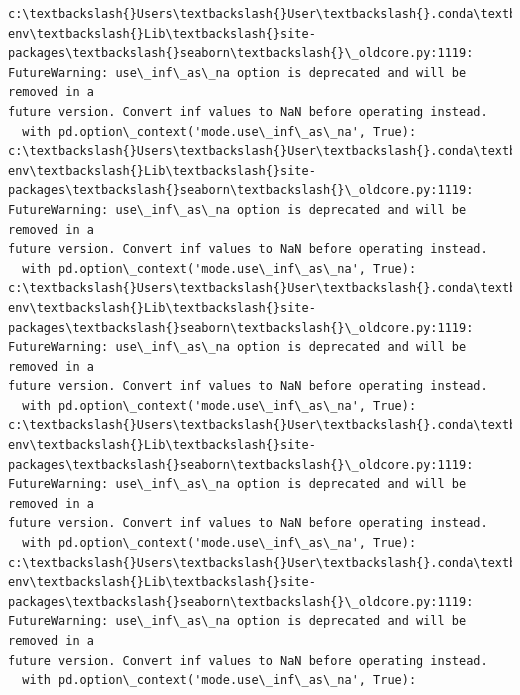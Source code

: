 \documentclass[11pt]{article}
\begin{document}
    \begin{Verbatim}[commandchars=\\\{\}]
c:\textbackslash{}Users\textbackslash{}User\textbackslash{}.conda\textbackslash{}envs\textbackslash{}learn-env\textbackslash{}Lib\textbackslash{}site-packages\textbackslash{}seaborn\textbackslash{}\_oldcore.py:1119:
FutureWarning: use\_inf\_as\_na option is deprecated and will be removed in a
future version. Convert inf values to NaN before operating instead.
  with pd.option\_context('mode.use\_inf\_as\_na', True):
c:\textbackslash{}Users\textbackslash{}User\textbackslash{}.conda\textbackslash{}envs\textbackslash{}learn-env\textbackslash{}Lib\textbackslash{}site-packages\textbackslash{}seaborn\textbackslash{}\_oldcore.py:1119:
FutureWarning: use\_inf\_as\_na option is deprecated and will be removed in a
future version. Convert inf values to NaN before operating instead.
  with pd.option\_context('mode.use\_inf\_as\_na', True):
c:\textbackslash{}Users\textbackslash{}User\textbackslash{}.conda\textbackslash{}envs\textbackslash{}learn-env\textbackslash{}Lib\textbackslash{}site-packages\textbackslash{}seaborn\textbackslash{}\_oldcore.py:1119:
FutureWarning: use\_inf\_as\_na option is deprecated and will be removed in a
future version. Convert inf values to NaN before operating instead.
  with pd.option\_context('mode.use\_inf\_as\_na', True):
c:\textbackslash{}Users\textbackslash{}User\textbackslash{}.conda\textbackslash{}envs\textbackslash{}learn-env\textbackslash{}Lib\textbackslash{}site-packages\textbackslash{}seaborn\textbackslash{}\_oldcore.py:1119:
FutureWarning: use\_inf\_as\_na option is deprecated and will be removed in a
future version. Convert inf values to NaN before operating instead.
  with pd.option\_context('mode.use\_inf\_as\_na', True):
c:\textbackslash{}Users\textbackslash{}User\textbackslash{}.conda\textbackslash{}envs\textbackslash{}learn-env\textbackslash{}Lib\textbackslash{}site-packages\textbackslash{}seaborn\textbackslash{}\_oldcore.py:1119:
FutureWarning: use\_inf\_as\_na option is deprecated and will be removed in a
future version. Convert inf values to NaN before operating instead.
  with pd.option\_context('mode.use\_inf\_as\_na', True):
    \end{Verbatim}

    \begin{center}
    \end{center}
    { \hspace*{\fill} \\}
    
\end{document}

